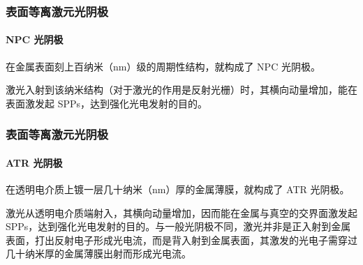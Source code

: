 \documentclass[ignorenonframetext, t]{beamer}
\begin{document}
\begin{frame}[label=current]
	\frametitle{表面等离激元光阴极}
	\framesubtitle{NPC 光阴极}
	在金属表面刻上百纳米（nm）级的周期性结构，就构成了 NPC 光阴极。
	\begin{physics}
	激光入射到该纳米结构（对于激光的作用是反射光栅）时，其横向动量增加，能在表面激发起 SPPs，达到强化光电发射的目的。
	\end{physics}
	
	
\end{frame}

\begin{frame}[label=current]
	\frametitle{表面等离激元光阴极}
	\framesubtitle{ATR 光阴极}
	在透明电介质上镀一层几十纳米（nm）厚的金属薄膜，就构成了 ATR 光阴极。
	\begin{physics}
	激光从透明电介质端射入，其横向动量增加，因而能在金属与真空的交界面激发起 SPPs，达到强化光电发射的目的。与一般光阴极不同，激光并非是正入射到金属表面，打出反射电子形成光电流，而是背入射到金属表面，其激发的光电子需穿过几十纳米厚的金属薄膜出射而形成光电流。
	\end{physics}
	
	
\end{frame}

%
\end{document}
